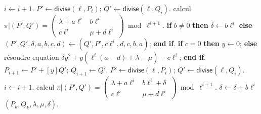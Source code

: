 \documentclass[10pt,a4paper]{book}
\theoremstyle{plain}
\theoremstyle{definition}
\theoremstyle{definition}
\theoremstyle{definition}
\theoremstyle{definition}
\theoremstyle{remark}
\theoremstyle{remark}
\theoremstyle{definition}
\begin{document}
\begin{algorithm}
\begin{algorithmic}[1]
\STATE $i \leftarrow i+1$.
\STATE\label{alg:app:diagonal:divide}
  $P' \leftarrow \mathsf{divise}(\ell, P_{i})$; $Q' \leftarrow \mathsf{divise} (\ell, Q_{i})$.
\STATE calcul $\pi|(P',Q')=\left( \begin{smallmatrix}
\lambda + a\ell^{i} & b\ell^{i}\\
c\ell^{i} & \mu + d\ell^{i} \end{smallmatrix} \right) \bmod {\ell^{i+1}}.$  
\ENDWHILE
\ELSE 
\STATE \textbf{if} $b \neq 0$ \textbf{then} $\delta \leftarrow b \ell^i$ \textbf{else} $(P',Q',\delta,a,b,c,d) \leftarrow (Q',P', c \ell^i,d,c,b,a)$; \textbf{end if}.
\STATE \textbf{if} $c = 0$ \textbf{then} $y \leftarrow 0$;
\STATE \textbf{else}  résoudre equation 
$ \delta  y^2 + y (\ell^i(a-d)+\lambda - \mu) - c\ell^i $; \textbf{end if}.
\STATE\label{alg:app:trigonal:upd-P}
  $P_{i+1} \leftarrow P' + [y] Q'$; $Q_{i+1} \leftarrow Q'$.
\STATE\label{alg:app:trigonal:divide}
  $P' \leftarrow \mathsf{divise}(\ell, P_{i})$; $Q' \leftarrow \mathsf{divise} (\ell, Q_{i})$.
\STATE $i \leftarrow i+1$.
\STATE calcul $\pi|(P',Q')=\left( \begin{smallmatrix}
\lambda + a\ell^{i} & b\ell^{i} + \delta\\
c\ell^{i} & \mu + d\ell^{i} \end{smallmatrix} \right) \bmod {\ell^{i+1}}.$  
\STATE $\delta \leftarrow \delta + b \ell^i$
\ENDWHILE
\ENDIF
\RETURN $(P_{k},Q_{k},\lambda,\mu, \delta).$
\end{algorithmic}
\end{algorithm}
\end{document}
